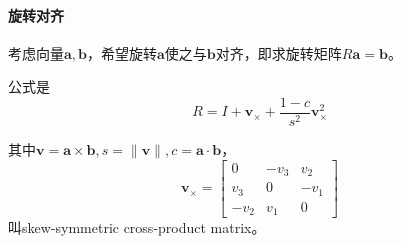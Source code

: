 \paragraph*{旋转对齐}考虑向量$\bm{a},\bm{b}$，希望旋转$\bm{a}$使之与$\bm{b}$对齐，即求旋转矩阵$R\bm{a}=\bm{b}$。

公式是
$$R=I+\bm{v}_{\times}+\frac{1-c}{s^2}\bm{v}_{\times}^2$$

其中$\bm{v}=\bm{a}\times \bm{b}, s=\|\bm{v}\|,c=\bm{a}\cdot\bm{b}$，
$$\bm{v}_{\times}=\begin{bmatrix}
0 & -v_3 & v_2 \\
v_3 &0 & -v_1\\
 -v_2& v_1& 0
\end{bmatrix}$$
叫skew-symmetric cross-product matrix。
\subsubsection{}